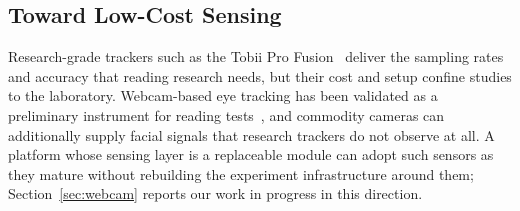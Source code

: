\subsection{Toward Low-Cost Sensing}
Research-grade trackers such as the Tobii Pro Fusion~\cite{tobii2025fusion} deliver the sampling rates and accuracy that reading research needs, but their cost and setup confine studies to the laboratory.
Webcam-based eye tracking has been validated as a preliminary instrument for reading tests~\cite{lin2022webcam}, and commodity cameras can additionally supply facial signals that research trackers do not observe at all.
A platform whose sensing layer is a replaceable module can adopt such sensors as they mature without rebuilding the experiment infrastructure around them; Section~\ref{sec:webcam} reports our work in progress in this direction.
